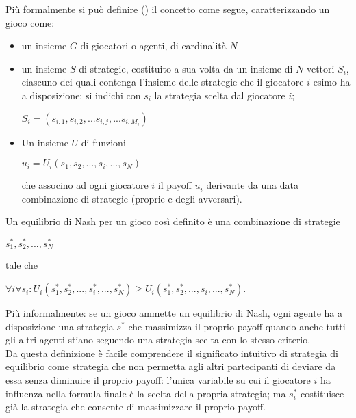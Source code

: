 Più formalmente si può definire (\cite{eponimo}) il concetto come segue, caratterizzando un gioco come:
\begin{itemize}
   \item un insieme $G$ di giocatori o agenti, di cardinalità $N$ 
   \item un insieme $S$ di strategie, costituito a sua volta da un insieme di $N$ vettori $S_i$, ciascuno dei quali contenga l'insieme delle strategie che il giocatore $i$-esimo ha a disposizione; si indichi con $s_i$ la strategia scelta dal giocatore $i$;
\begin{center}
   $S_i = (s_{i,1},s_{i,2},...s_{i,j},...s_{i,M_i})$
\end{center}   
\item Un insieme $U$ di funzioni
\begin{center}
   $u_i=U_i\left(s_1, s_2,...,s_i,...,s_N\right)$
\end{center}
che associno ad ogni giocatore $i$ il payoff $u_i$ derivante da una data combinazione di strategie (proprie e degli avversari).
\end{itemize}


Un equilibrio di Nash per un gioco così definito è una combinazione di strategie
\begin{center}
   $s_1^*, s_2^*,...,s_N^*$
\end{center}

tale che

\begin{center}
    $  \forall i \forall s_i :   U_i\left(s_1^*, s_2^*,...,s_i^*,...,s_N^*\right)\ge U_i\left(s_1^*, s_2^*,...,s_i,...,s_N^*\right)$.
\end{center}



Più informalmente: se un gioco ammette un equilibrio di Nash, ogni agente ha a disposizione una strategia $s^*$ che massimizza il proprio payoff quando anche tutti gli altri agenti stiano seguendo una strategia scelta con lo stesso criterio.\\
Da questa definizione è facile comprendere il significato intuitivo di strategia di equilibrio come strategia che non permetta agli altri partecipanti di deviare da essa senza diminuire il proprio payoff: l'unica variabile su cui il giocatore $i$ ha influenza nella formula finale è la scelta della propria strategia; ma $s_i^*$ costituisce già la strategia che consente di massimizzare il proprio payoff.


